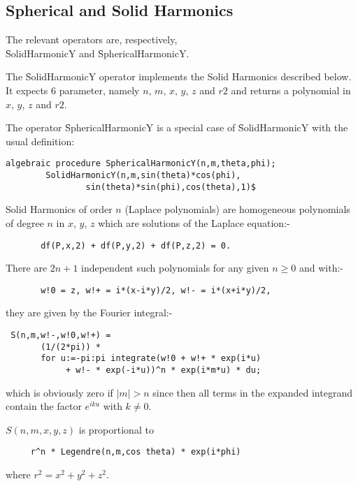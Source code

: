 \subsection{Spherical and Solid Harmonics}
\hypertarget{operator:SPHERICALHARMONICY}{}
\hypertarget{operator:SOLIDHARMONICY}{}
\hypertarget{SPHSOLH}{}
 
 
The relevant operators are, respectively,\\
\f{SolidHarmonicY} and \f{SphericalHarmonicY}.

The \f{SolidHarmonicY} operator implements the Solid Harmonics
described below. It expects 6 parameter, namely $n$, $m$, $x$, $y$, $z$ and $r2$
and returns a polynomial in $x$, $y$, $z$ and $r2$.

The operator
\f{SphericalHarmonicY} is a special case of \f{SolidHarmonicY}
with the usual definition:

\begin{verbatim}
algebraic procedure SphericalHarmonicY(n,m,theta,phi);
        SolidHarmonicY(n,m,sin(theta)*cos(phi),
                sin(theta)*sin(phi),cos(theta),1)$
\end{verbatim}


Solid Harmonics of order $n$ (Laplace polynomials)
are homogeneous polynomials of degree $n$ in $x$, $y$, $z$
which are solutions of the Laplace equation:-

\begin{verbatim}
       df(P,x,2) + df(P,y,2) + df(P,z,2) = 0.
\end{verbatim}

There are $2n+1$ independent such polynomials for any given $n \geq 0$
and with:-

\begin{verbatim}
       w!0 = z, w!+ = i*(x-i*y)/2, w!- = i*(x+i*y)/2,
\end{verbatim}

they are given by the Fourier integral:-

\begin{verbatim}
 S(n,m,w!-,w!0,w!+) =
       (1/(2*pi)) *
       for u:=-pi:pi integrate(w!0 + w!+ * exp(i*u)
            + w!- * exp(-i*u))^n * exp(i*m*u) * du;
\end{verbatim}

which is obviously zero if $|m| > n$ since then all terms in the
expanded integrand contain the factor $e^{iku}$ with $k \neq 0$.

$S(n,m,x,y,z)$ is proportional to
\begin{verbatim}
     r^n * Legendre(n,m,cos theta) * exp(i*phi)
\end{verbatim}
where $r^2 = x^2 + y^2 + z^2$.

